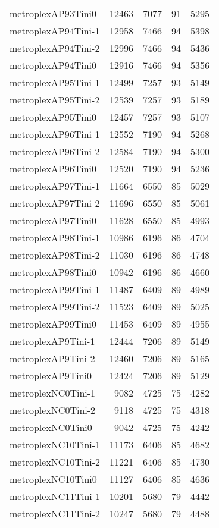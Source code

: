 \begin{longtable}{lrrrr}
metroplexAP93Tini0 & 12463 & 7077 & 91 & 5295 \\
metroplexAP94Tini-1 & 12958 & 7466 & 94 & 5398 \\
metroplexAP94Tini-2 & 12996 & 7466 & 94 & 5436 \\
metroplexAP94Tini0 & 12916 & 7466 & 94 & 5356 \\
metroplexAP95Tini-1 & 12499 & 7257 & 93 & 5149 \\
metroplexAP95Tini-2 & 12539 & 7257 & 93 & 5189 \\
metroplexAP95Tini0 & 12457 & 7257 & 93 & 5107 \\
metroplexAP96Tini-1 & 12552 & 7190 & 94 & 5268 \\
metroplexAP96Tini-2 & 12584 & 7190 & 94 & 5300 \\
metroplexAP96Tini0 & 12520 & 7190 & 94 & 5236 \\
metroplexAP97Tini-1 & 11664 & 6550 & 85 & 5029 \\
metroplexAP97Tini-2 & 11696 & 6550 & 85 & 5061 \\
metroplexAP97Tini0 & 11628 & 6550 & 85 & 4993 \\
metroplexAP98Tini-1 & 10986 & 6196 & 86 & 4704 \\
metroplexAP98Tini-2 & 11030 & 6196 & 86 & 4748 \\
metroplexAP98Tini0 & 10942 & 6196 & 86 & 4660 \\
metroplexAP99Tini-1 & 11487 & 6409 & 89 & 4989 \\
metroplexAP99Tini-2 & 11523 & 6409 & 89 & 5025 \\
metroplexAP99Tini0 & 11453 & 6409 & 89 & 4955 \\
metroplexAP9Tini-1 & 12444 & 7206 & 89 & 5149 \\
metroplexAP9Tini-2 & 12460 & 7206 & 89 & 5165 \\
metroplexAP9Tini0 & 12424 & 7206 & 89 & 5129 \\
metroplexNC0Tini-1 & 9082 & 4725 & 75 & 4282 \\
metroplexNC0Tini-2 & 9118 & 4725 & 75 & 4318 \\
metroplexNC0Tini0 & 9042 & 4725 & 75 & 4242 \\
metroplexNC10Tini-1 & 11173 & 6406 & 85 & 4682 \\
metroplexNC10Tini-2 & 11221 & 6406 & 85 & 4730 \\
metroplexNC10Tini0 & 11127 & 6406 & 85 & 4636 \\
metroplexNC11Tini-1 & 10201 & 5680 & 79 & 4442 \\
metroplexNC11Tini-2 & 10247 & 5680 & 79 & 4488 \\

\end{longtable}
